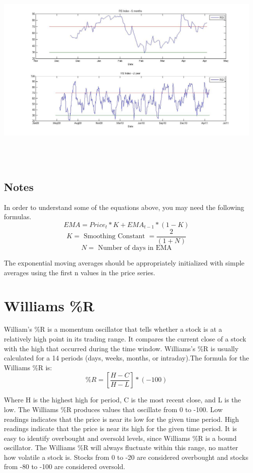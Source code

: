 \documentclass[12pt]{article}
\begin{document}
\graphicspath{{C:\Users\Santosoy\Downloads}}
\includegraphics[height=4in,width=5.5in]{RSI.jpg}

\subsection{Notes}
\hspace{6 mm}In order to understand some of the equations above, you may need the following formulas.
\[
		EMA=Price_{t}*K+EMA_{t-1}*(1-K)
\]
\[
    K=\text{ Smoothing Constant }=\frac{2}{(1+N)}
\]
\[
		N=\text{ Number of days in EMA}
\]

The exponential moving averages should be appropriately initialized with simple averages using the first n values in the price series.

\section{Williams \%R}
\hspace{6 mm}William's \%R is a momentum oscillator that tells whether a stock is at a relatively high point in its trading range. It compares the current close of a stock with the high that occurred during the time window. Williams's \%R is usually calculated for a 14 periods (days, weeks, months, or intraday).The formula for the Williams \%R is:
\[
		\%R=[\frac{H-C}{H-L}]*(-100)
\]

Where H is the highest high for period, C is the most recent close, and L is the low. The Williams \%R produces values that oscillate from 0 to -100. Low readings indicates that the price is near its low for the given time period. High readings indicate that the price is near its high for the given time period. It is easy to identify overbought and oversold levels, since Williams \%R is a bound oscillator. The Williams \%R will always fluctuate within this range, no matter how volatile a stock is. Stocks from 0 to -20 are considered overbought and stocks from -80 to -100 are considered oversold.
\end{document}
